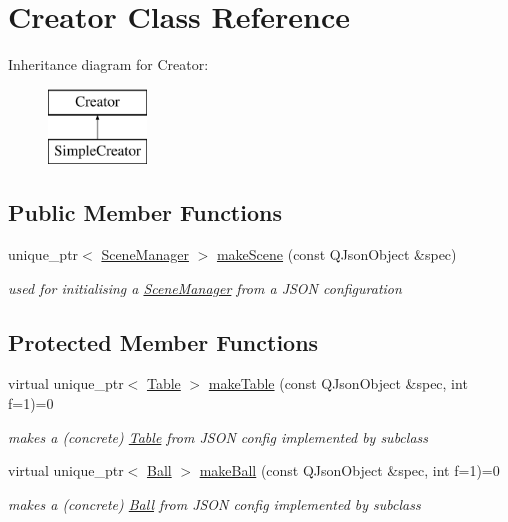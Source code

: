 \hypertarget{class_creator}{}\section{Creator Class Reference}
\label{class_creator}
Inheritance diagram for Creator\+:\begin{figure}[H]
\begin{center}
\leavevmode
\includegraphics[height=2.000000cm]{class_creator}
\end{center}
\end{figure}
\subsection*{Public Member Functions}
\begin{DoxyCompactItemize}
\item 
unique\+\_\+ptr$<$ \mbox{\hyperlink{class_scene_manager}{Scene\+Manager}} $>$ \mbox{\hyperlink{class_creator_ae2ccbd8403068b381ad49e6c3b39891f}{make\+Scene}} (const Q\+Json\+Object \&spec)
\begin{DoxyCompactList}\small\item\em used for initialising a \mbox{\hyperlink{class_scene_manager}{Scene\+Manager}} from a J\+S\+ON configuration \end{DoxyCompactList}\end{DoxyCompactItemize}
\subsection*{Protected Member Functions}
\begin{DoxyCompactItemize}
\item 
virtual unique\+\_\+ptr$<$ \mbox{\hyperlink{class_table}{Table}} $>$ \mbox{\hyperlink{class_creator_a70c571c0b776a5f29494f660957e0710}{make\+Table}} (const Q\+Json\+Object \&spec, int f=1)=0
\begin{DoxyCompactList}\small\item\em makes a (concrete) \mbox{\hyperlink{class_table}{Table}} from J\+S\+ON config implemented by subclass \end{DoxyCompactList}\item 
virtual unique\+\_\+ptr$<$ \mbox{\hyperlink{class_ball}{Ball}} $>$ \mbox{\hyperlink{class_creator_aa3f6415656f52625d4f3051bfa70d4eb}{make\+Ball}} (const Q\+Json\+Object \&spec, int f=1)=0
\begin{DoxyCompactList}\small\item\em makes a (concrete) \mbox{\hyperlink{class_ball}{Ball}} from J\+S\+ON config implemented by subclass \end{DoxyCompactList}\end{DoxyCompactItemize}


